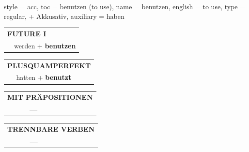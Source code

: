 \begin{verbentry}{
  style = {acc},
  toc = {benutzen (to use)},
  name = {benutzen},
  english = {to use},
  type = {regular, + Akkusativ},
  auxiliary = {haben}
}
\begin{tabular}{rl}
    \multicolumn{2}{l}{\textbf{FUTURE I} }\\
   & werden + \textbf{benutzen}\\
 
  \end{tabular}
\hfill
   \begin{tabular}{rl}
      \multicolumn{2}{l}{\textbf{PLUSQUAMPERFEKT}}\\
   & hatten + \textbf{benutzt}\\
  \end{tabular}
  
  \vspace{-5pt}\vspace{10pt}

\begin{tabular}{lll}
\multicolumn{3}{l}{\textbf{MIT PRÄPOSITIONEN}}\\
& \textbf{---} & \\
\end{tabular}
\hfill
\begin{tabular}{lll}
\multicolumn{3}{l}{\textbf{TRENNBARE VERBEN}}\\
& \textbf{---} & \\
\end{tabular}

\vspace{-5pt}
\end{verbentry}

